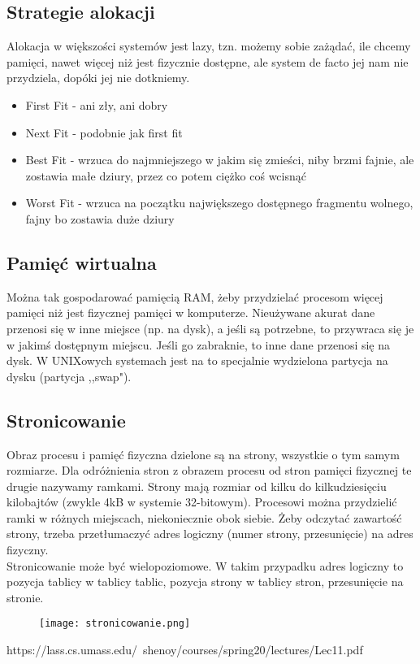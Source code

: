 \documentclass[12pt, a4paper, polish, openany]{book}
\begin{document}
\subsection{Strategie alokacji}
Alokacja w większości systemów jest lazy, tzn. możemy sobie zażądać, ile chcemy pamięci, nawet więcej niż jest fizycznie dostępne, ale system de facto jej nam nie przydziela, dopóki jej nie dotkniemy.
\begin{itemize}
  \item First Fit - ani zły, ani dobry
  \item Next Fit - podobnie jak first fit
  \item Best Fit - wrzuca do najmniejszego w jakim się zmieści, niby brzmi fajnie, ale zostawia małe dziury, przez co potem ciężko coś wcisnąć
  \item Worst Fit - wrzuca na początku największego dostępnego fragmentu wolnego, fajny bo zostawia duże dziury
\end{itemize}
\subsection{Pamięć wirtualna}
Można tak gospodarować pamięcią RAM, żeby przydzielać procesom więcej pamięci niż jest fizycznej pamięci w komputerze. Nieużywane akurat dane przenosi się w inne miejsce (np. na dysk), a jeśli są potrzebne, to przywraca się je w jakimś dostępnym miejscu. Jeśli go zabraknie, to inne dane przenosi się na dysk. W UNIXowych systemach jest na to specjalnie wydzielona partycja na dysku (partycja ,,swap").
\subsection{Stronicowanie}
Obraz procesu i pamięć fizyczna dzielone są na strony, wszystkie o tym samym rozmiarze. Dla odróżnienia stron z obrazem procesu od stron pamięci fizycznej te drugie nazywamy ramkami. Strony mają rozmiar od kilku do kilkudziesięciu kilobajtów (zwykle 4kB w systemie 32-bitowym). Procesowi można przydzielić ramki w różnych miejscach, niekoniecznie obok siebie. Żeby odczytać zawartość strony, trzeba przetłumaczyć adres logiczny (numer strony, przesunięcie) na adres fizyczny. \\
Stronicowanie może być wielopoziomowe. W takim przypadku adres logiczny to pozycja tablicy w tablicy tablic, pozycja strony w tablicy stron, przesunięcie na stronie.
\begin{figure}[H]
  \centering
  \texttt{[image: stronicowanie.png]}
\end{figure}
\begin{center}
  {\tiny https://lass.cs.umass.edu/~shenoy/courses/spring20/lectures/Lec11.pdf}
\end{center}
\end{document}

